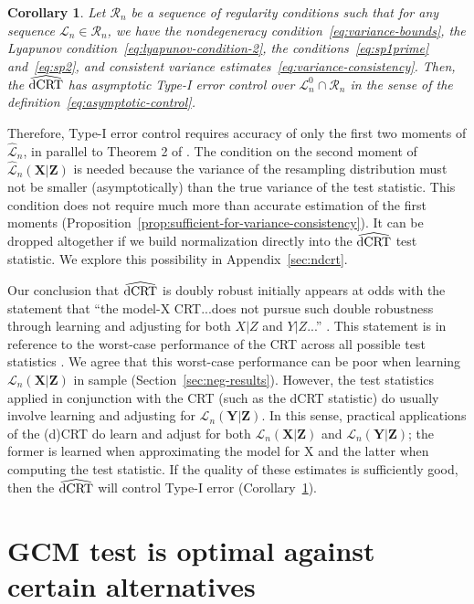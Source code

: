\documentclass[12pt]{article}
\newtheorem{corollary}{Corollary}
\theoremstyle{definition}
\theoremstyle{remark}
\newcommand\linktoproof[1]{ {\normalfont[{\hyperlink{#1}{Proof}}]} }
\newcommand{\prx}{\bm X}								%
\newcommand{\prz}{\bm Z}								%
\newcommand{\pry}{{\bm Y}}								%
\newcommand{\law}{\mathcal L}							%
\newcommand{\nulllaws}{\mathscr L^0}					%
\newcommand{\regclass}{\mathscr R}					    %
\newcommand{\lawhat}{\widehat{\mathcal L}}				%
\newcommand{\dCRThat}{\widehat{\textnormal{dCRT}}}		%
\begin{document}
	\begin{corollary} \label{cor:dcrt-double-robustness} \linktoproof{proof:cor:dcrt-double-robustness}
		Let $\regclass_n$ be a sequence of regularity conditions such that for any sequence $\law_n \in \regclass_n$, we have the nondegeneracy condition~\eqref{eq:variance-bounds}, the Lyapunov condition~\eqref{eq:lyapunov-condition-2}, the conditions~\eqref{eq:sp1prime} and~\eqref{eq:sp2}, and consistent variance estimates~\eqref{eq:variance-consistency}. Then, the $\dCRThat$ has asymptotic Type-I error control over $\nulllaws_n \cap \regclass_n$ in the sense of the definition~\eqref{eq:asymptotic-control}.
	\end{corollary}
	
	Therefore, Type-I error control requires accuracy of only the first two moments of $\lawhat_n$, in parallel to Theorem 2 of \citet{Katsevich2020a}. The condition on the second moment of $\lawhat_n(\prx|\prz)$ is needed because the variance of the resampling distribution must not be smaller (asymptotically) than the true variance of the test statistic. This condition does not require much more than accurate estimation of the first moments (Proposition~\ref{prop:sufficient-for-variance-consistency}). It can be dropped altogether if we build normalization directly into the $\dCRThat$ test statistic. We explore this possibility in Appendix~\ref{sec:ndcrt}.
	
	Our conclusion that $\dCRThat$ is doubly robust initially appears at odds with the statement that ``the model-X CRT...does not pursue such double robustness through learning and adjusting for both $X|Z$ and $Y|Z$...'' \citep{Li2022}. This statement is in reference to the worst-case performance of the CRT across all possible test statistics \citep{Berrett2019}. We agree that this worst-case performance can be poor when learning $\law_n(\prx|\prz)$ in sample (Section~\ref{sec:neg-results}). However, the test statistics applied in conjunction with the CRT (such as the dCRT statistic) do usually involve learning and adjusting for $\law_n(\pry|\prz)$. In this sense, practical applications of the (d)CRT do learn and adjust for both $\law_n(\prx|\prz)$ and $\law_n(\pry|\prz)$; the former is learned when approximating the model for X and the latter when computing the test statistic. If the quality of these estimates is sufficiently good, then the $\dCRThat$ will control Type-I error (Corollary~\ref{cor:dcrt-double-robustness}).
	
	
	\section{GCM test is optimal against certain alternatives} \label{sec:optimality}
	
\end{document}
